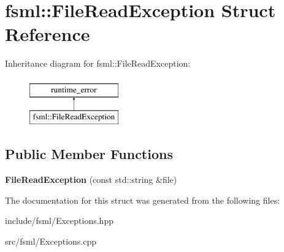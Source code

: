 \hypertarget{structfsml_1_1FileReadException}{\section{fsml\-:\-:File\-Read\-Exception Struct Reference}
\label{structfsml_1_1FileReadException}
}
Inheritance diagram for fsml\-:\-:File\-Read\-Exception\-:\begin{figure}[H]
\begin{center}
\leavevmode
\includegraphics[height=2.000000cm]{structfsml_1_1FileReadException}
\end{center}
\end{figure}
\subsection*{Public Member Functions}
\begin{DoxyCompactItemize}
\item 
\hypertarget{structfsml_1_1FileReadException_a659fb09fec2fb56251b07ff27ddc1389}{{\bfseries File\-Read\-Exception} (const std\-::string \&file)}\label{structfsml_1_1FileReadException_a659fb09fec2fb56251b07ff27ddc1389}

\end{DoxyCompactItemize}


The documentation for this struct was generated from the following files\-:\begin{DoxyCompactItemize}
\item 
include/fsml/Exceptions.\-hpp\item 
src/fsml/Exceptions.\-cpp\end{DoxyCompactItemize}
